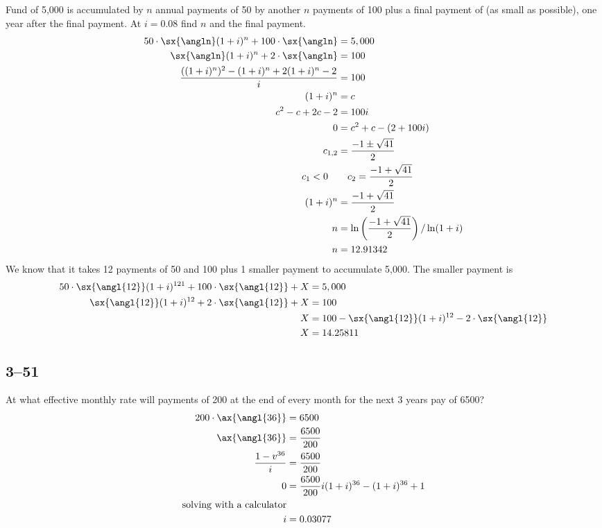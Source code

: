 \documentclass[a4paper, 12pt, reqno]{amsart}
\numberwithin{equation}{section}
\begin{document}
Fund of 5,000 is accumulated by $n$ annual payments of 50 by another $n$ 
payments of 100 plus a final payment of (as small as possible), one year after 
the final payment. At $i=0.08$ find $n$ and the final payment.
\begin{equation}\nonumber
    \begin{aligned}
        50 \cdot \sx{\angln}(1+i)^n + 100 \cdot \sx{\angln} &= 5,000    \\
        \sx{\angln}(1+i)^n + 2 \cdot \sx{\angln} &= 100 \\
        \frac{((1+i)^n)^2- (1+i)^n + 2(1+i)^n - 2}{i} &= 100 \\
        (1+i)^n &= c    \\
        c^2- c + 2c - 2 &= 100i \\
        0 &= c^2 + c - (2 + 100i) \\
        c_{1,2} &= \frac{-1 \pm \sqrt{41}}{2}   \\
        c_1 < 0 \quad &\quad c_2 = \frac{-1 + \sqrt{41}}{2} \\
        (1+i)^n &= \frac{-1 + \sqrt{41}}{2}     \\
        n &= \ln\left(\frac{-1 + \sqrt{41}}{2}\right) / \ln(1+i)     \\
        n &= 12.91342
    \end{aligned}
\end{equation}
We know that it takes 12 payments of 50 and 100 plus 1 smaller payment to
accumulate 5,000. The smaller payment is
\begin{equation}\nonumber
    \begin{aligned}
        50 \cdot \sx{\angl{12}}(1+i)^{121} + 100 \cdot \sx{\angl{12}} + X 
            &= 5,000       \\
        \sx{\angl{12}}(1+i)^{12} + 2 \cdot \sx{\angl{12}} + X 
            &= 100       \\
        X &= 100 - \sx{\angl{12}}(1+i)^{12} - 2 \cdot \sx{\angl{12}}    \\
        X &= 14.25811
    \end{aligned}
\end{equation}

\subsection*{3--51}

At what effective monthly rate will payments of 200 at the end of every month
for the next 3 years pay of 6500?
\begin{equation}\nonumber
    \begin{aligned}
        200 \cdot \ax{\angl{36}} &= 6500    \\
        \ax{\angl{36}} &= \frac{6500}{200}    \\
        \frac{1-v^{36}}{i} &= \frac{6500}{200}    \\
        0 &= \frac{6500}{200}i(1+i)^{36} - (1+i)^{36} + 1 \\
        \text{solving with a calculator}    \\
        i &= 0.03077
    \end{aligned}
\end{equation}
\end{document}
